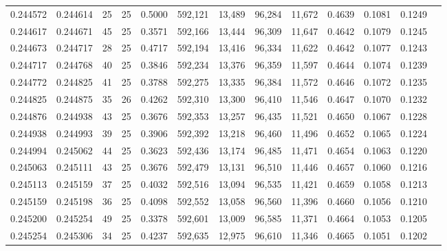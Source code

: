 \begin{tabular}{rrrrrrrrrrrrr}
0.244572 & 0.244614 &    25 &  25 &                                     0.5000 & 592,121 &  13,489 &  96,284 &  11,672 & 0.4639 & 0.1081 & 0.1249 \\
0.244617 & 0.244671 &    45 &  25 &                                     0.3571 & 592,166 &  13,444 &  96,309 &  11,647 & 0.4642 & 0.1079 & 0.1245 \\
0.244673 & 0.244717 &    28 &  25 &                                     0.4717 & 592,194 &  13,416 &  96,334 &  11,622 & 0.4642 & 0.1077 & 0.1243 \\
0.244717 & 0.244768 &    40 &  25 &                                     0.3846 & 592,234 &  13,376 &  96,359 &  11,597 & 0.4644 & 0.1074 & 0.1239 \\
0.244772 & 0.244825 &    41 &  25 &                                     0.3788 & 592,275 &  13,335 &  96,384 &  11,572 & 0.4646 & 0.1072 & 0.1235 \\
0.244825 & 0.244875 &    35 &  26 &                                     0.4262 & 592,310 &  13,300 &  96,410 &  11,546 & 0.4647 & 0.1070 & 0.1232 \\
0.244876 & 0.244938 &    43 &  25 &                                     0.3676 & 592,353 &  13,257 &  96,435 &  11,521 & 0.4650 & 0.1067 & 0.1228 \\
0.244938 & 0.244993 &    39 &  25 &                                     0.3906 & 592,392 &  13,218 &  96,460 &  11,496 & 0.4652 & 0.1065 & 0.1224 \\
0.244994 & 0.245062 &    44 &  25 &                                     0.3623 & 592,436 &  13,174 &  96,485 &  11,471 & 0.4654 & 0.1063 & 0.1220 \\
0.245063 & 0.245111 &    43 &  25 &                                     0.3676 & 592,479 &  13,131 &  96,510 &  11,446 & 0.4657 & 0.1060 & 0.1216 \\
0.245113 & 0.245159 &    37 &  25 &                                     0.4032 & 592,516 &  13,094 &  96,535 &  11,421 & 0.4659 & 0.1058 & 0.1213 \\
0.245159 & 0.245198 &    36 &  25 &                                     0.4098 & 592,552 &  13,058 &  96,560 &  11,396 & 0.4660 & 0.1056 & 0.1210 \\
0.245200 & 0.245254 &    49 &  25 &                                     0.3378 & 592,601 &  13,009 &  96,585 &  11,371 & 0.4664 & 0.1053 & 0.1205 \\
0.245254 & 0.245306 &    34 &  25 &                                     0.4237 & 592,635 &  12,975 &  96,610 &  11,346 & 0.4665 & 0.1051 & 0.1202 \\

\end{tabular}
